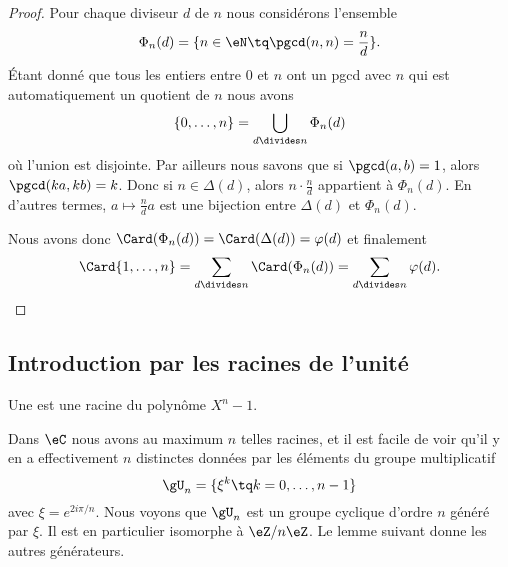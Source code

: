 \begin{proof}
    Pour chaque diviseur \( d\) de \( n\) nous considérons l'ensemble
    \begin{equation}
        \Phi_n(d)=\{ n\in \eN\tq \pgcd(n,n)=\frac{ n }{ d } \}.
    \end{equation}
    Étant donné que tous les entiers entre \( 0\) et \( n\) ont un pgcd avec \( n\) qui est automatiquement un quotient de \( n\) nous avons
    \begin{equation}
        \{ 0,\ldots, n \}=\bigcup_{d\divides n}\Phi_n(d)
    \end{equation}
    où l'union est disjointe. Par ailleurs nous savons que si \( \pgcd(a,b)=1\), alors \( \pgcd(ka,kb)=k\). Donc si \( n\in \Delta(d)\), alors \( n\cdot \frac{ n }{ d }\) appartient à \( \Phi_n(d)\). En d'autres termes, \( a\mapsto \frac{ n }{ d }a\) est une bijection entre \( \Delta(d)\) et \( \Phi_n(d)\).

    Nous avons donc \( \Card(\Phi_n(d))=\Card(\Delta(d))=\varphi(d)\) et finalement
    \begin{equation}
        \Card\{ 1,\ldots, n \}=\sum_{d\divides n}\Card(\Phi_n(d))=\sum_{d\divides n}\varphi(d).
    \end{equation}
\end{proof}

\subsection{Introduction par les racines de l'unité}
\label{SubSechZeTuL}

\begin{definition}
    Une  est une racine du polynôme \( X^n-1\).
\end{definition}

Dans \( \eC\) nous avons au maximum \( n\) telles racines, et il est facile de voir qu'il y en a effectivement \( n\) distinctes données par les éléments du groupe multiplicatif
\begin{equation}
    \gU_n=\{ \xi^k\tq k=0,\ldots, n-1 \}
\end{equation}
avec \( \xi= e^{2i\pi/n}\). Nous voyons que \( \gU_n\) est un groupe cyclique d'ordre \( n\) généré par \( \xi\). Il est en particulier isomorphe à \( \eZ/n\eZ\). Le lemme suivant donne les autres générateurs.

